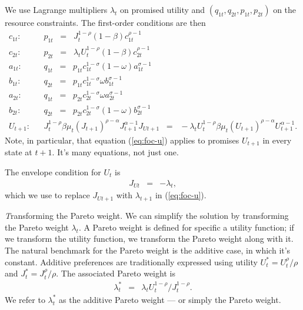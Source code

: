 We use Lagrange multipliers $\lambda_t$ on promised utility
and $(q_{1t}, q_{2t}, p_{1t}, p_{2t})$ on the resource constraints.
The first-order conditions are then
\begin{eqnarray}
    {c}_{1t}: &&  p_{1t} \;\;=\;\; {J}_t^{1-\rho} (1-\beta) {c}_{1t}^{\rho-1}
            \label{eq:foc-c1} \\
    {c}_{2t}: &&  p_{2t} \;\;=\;\; \lambda_t {U}_t^{1-\rho} (1-\beta) {c}_{2t}^{\rho-1}
            \label{eq:foc-c2} \\
    {a}_{1t}: &&  q_{1t} \;\;=\;\; p_{1t} {c}_{1t}^{1-\sigma} (1-\omega) {a}_{1t}^{\sigma-1}
            \label{eq:foc-a1} \\
    {b}_{1t}: &&  q_{2t} \;\;=\;\; p_{1t} {c}_{1t}^{1-\sigma} \omega {b}_{1t}^{\sigma-1}
            \label{eq:foc-b1} \\
    {a}_{2t}: &&  q_{1t} \;\;=\;\; p_{2t} {c}_{2t}^{1-\sigma} \omega {a}_{2t}^{\sigma-1}
            \label{eq:foc-a2} \\
    {b}_{2t}: &&  q_{2t} \;\;=\;\; p_{2t} {c}_{2t}^{1-\sigma} (1-\omega) {b}_{2t}^{\sigma-1}
            \label{eq:foc-b2} \\
    {U}_{t+1}:&&  {J}_t^{1-\rho} \beta \mu_t ({J}_{t+1})^{\rho-\alpha} {J}_{t+1}^{\alpha-1} {J}_{Ut+1}
            \;\;=\;\; - \lambda_t {U}_t^{1-\rho} \beta \mu_t ({U}_{t+1})^{\rho-\alpha} {U}_{t+1}^{\alpha-1} .
            \label{eq:foc-u}
\end{eqnarray}
Note, in particular, that equation (\ref{eq:foc-u}) applies to promises $U_{t+1}$
in every state at $t+1$.  It's many equations, not just one.

The envelope condition for ${U}_t$ is
\begin{eqnarray*}
    {J}_{Ut} &=& - \lambda_t ,
\end{eqnarray*}
which we use to replace $J_{Ut+1}$ with $\lambda_{t+1}$ in  (\ref{eq:foc-u}).

{\textit Transforming the Pareto weight.\/}
We can simplify the solution by transforming the Pareto weight $\lambda_t$.
A Pareto weight is defined for specific a utility function;
if we transform the utility function, we transform the Pareto weight along with it.
The natural benchmark for the Pareto weight is the additive case, in which it's constant.
Additive preferences are traditionally expressed using utility $U_{t}^* = U_{t}^\rho/\rho$ and $J_{t}^* = J_{t}^\rho/\rho$.
The associated Pareto weight is
\begin{eqnarray*}
    \lambda_t^* &=& \lambda_t {U}_t^{1-\rho}/ {J}_t^{1-\rho} .
\end{eqnarray*}
We refer to $\lambda^*_t$ as the additive Pareto weight ---
or simply the Pareto weight.

